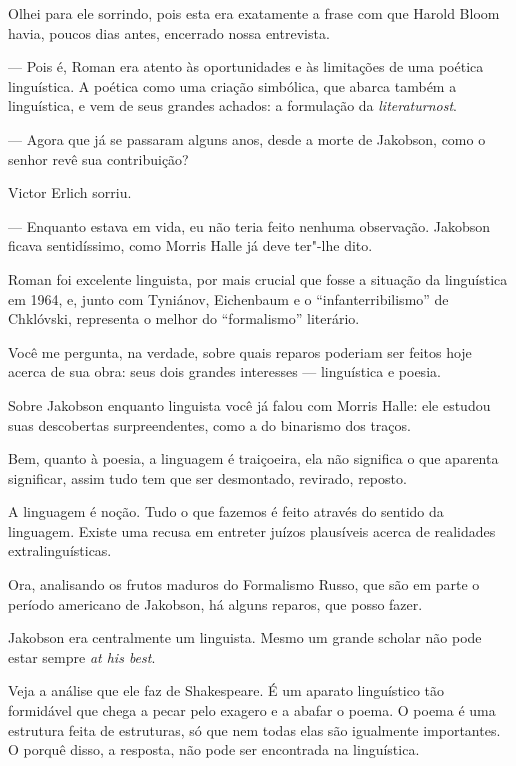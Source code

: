 Olhei para ele sorrindo, pois esta era exatamente a frase com que Harold
Bloom havia, poucos dias antes, encerrado nossa entrevista.

--- Pois é, Roman era atento às oportunidades e às limitações de uma
poética linguística. A poética como uma criação simbólica, que abarca
também a linguística, e vem de seus grandes achados: a formulação da
\emph{literaturnost}.

--- Agora que já se passaram alguns anos, desde a morte de Jakobson, como o
senhor revê sua contribuição?

Victor Erlich sorriu.

--- Enquanto estava em vida, eu não teria feito nenhuma observação.
Jakobson ficava sentidíssimo, como Morris Halle já deve ter"-lhe dito.

Roman foi excelente linguista, por mais crucial que fosse a situação da
linguística em 1964, e, junto com Tyniánov, Eichenbaum e o
``infanterribilismo'' de Chklóvski, representa o melhor do
``formalismo'' literário.

Você me pergunta, na verdade, sobre quais reparos poderiam ser feitos
hoje acerca de sua obra: seus dois grandes interesses --- linguística e
poesia.

Sobre Jakobson enquanto linguista você já falou com Morris Halle: ele
estudou suas descobertas surpreendentes, como a do binarismo dos traços.

Bem, quanto à poesia, a linguagem é traiçoeira, ela não significa o que
aparenta significar, assim tudo tem que ser desmontado, revirado,
reposto.

A linguagem é noção. Tudo o que fazemos é feito através do sentido da
linguagem. Existe uma recusa em entreter juízos plausíveis acerca de
realidades extralinguísticas.

Ora, analisando os frutos maduros do Formalismo Russo, que são em parte
o período americano de Jakobson, há alguns reparos, que posso fazer.

Jakobson era centralmente um linguista. Mesmo um grande scholar não pode
estar sempre \emph{at his best}.

Veja a análise que ele faz de Shakespeare. É um aparato linguístico tão formidável que chega a
pecar pelo exagero e a abafar o poema. O poema é uma estrutura feita de
estruturas, só que nem todas elas são igualmente importantes. O porquê
disso, a resposta, não pode ser encontrada na linguística.

